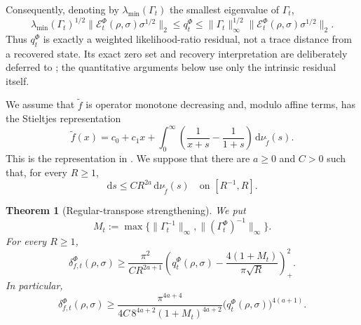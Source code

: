 \documentclass[11pt]{article}
\newtheorem{theorem}[theorem]{Theorem}
\theoremstyle{remark}
\newcommand{\1}{\mathbbm{1}}
\begin{document}
Consequently, denoting by $\lambda_{\min}(\Gamma_t)$ the smallest
eigenvalue of $\Gamma_t$,
\begin{equation}
 \lambda_{\min}(\Gamma_t)^{1/2}\lVert
 \mathcal E_t^\Phi(\rho,\sigma)\sigma^{1/2}\rVert_2
 \leq q_t^\Phi
 \leq\lVert\Gamma_t\rVert_\infty^{1/2}
       \lVert\mathcal E_t^\Phi(\rho,\sigma)
       \sigma^{1/2}\rVert_2.
 \label{eq:consolidated-qt-weighted-residual}
\end{equation}
Thus $q_t^\Phi$ is exactly a weighted likelihood-ratio residual,
not a trace distance from a recovered state.
Its exact zero set and recovery interpretation are deliberately
deferred to ; the quantitative
arguments below use only the intrinsic residual itself.

We assume that $\widetilde f$ is operator monotone decreasing and,
modulo affine terms, has the Stieltjes representation
\begin{equation}
 \widetilde f(x)=c_0+c_1x+
 \int_0^\infty\left(\frac1{x+s}-\frac1{1+s}\right)
 \,\mathrm d\nu_{\widetilde f}(s).
 \label{eq:consolidated-transpose-measure}
\end{equation}
This is the representation in
\cite[Section~2, Eq.~(2.1)]{carlen2018recovery}.
We suppose that there are $a\geq0$ and $C>0$ such that, for every
$R\geq1$,
\begin{equation}
 \mathrm ds\leq C R^{2a}\,\mathrm d\nu_{\widetilde f}(s)
 \quad\text{on }[R^{-1},R].
 \label{eq:consolidated-measure-regularity}
\end{equation}

\begin{theorem}[Regular-transpose strengthening]
\label{thm:consolidated-regular-transpose}
We put
\begin{equation}
 M_t:=\max\{\lVert\Gamma_t^{-1}\rVert_\infty,
                  \lVert(\Gamma_t^\Phi)^{-1}\rVert_\infty\}.
\end{equation}
For every $R\geq1$,
\begin{equation}
 \delta_{f,t}^{\Phi}(\rho,\sigma)
 \geq\frac{\pi^2}{C R^{2a+1}}
 \left(q_t^\Phi(\rho,\sigma)
 -\frac{4(1+M_t)}{\pi\sqrt R}\right)_+^2.
 \label{eq:consolidated-scale-bound}
\end{equation}
In particular,
\begin{equation}
 \delta_{f,t}^{\Phi}(\rho,\sigma)
 \geq
 \frac{\pi^{4a+4}}
 {4C\,8^{4a+2}(1+M_t)^{4a+2}}
 \bigl(q_t^\Phi(\rho,\sigma)\bigr)^{4(a+1)}.
 \label{eq:consolidated-power-bound}
\end{equation}
\end{theorem}
\end{document}
